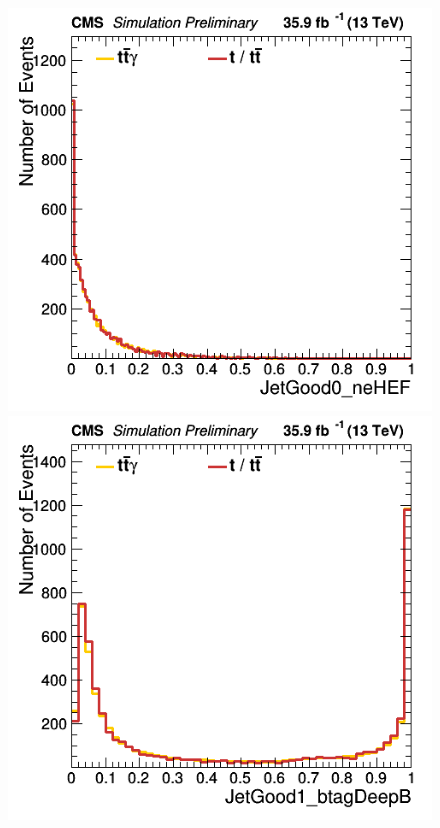 \documentclass[11pt]{scrartcl}
\begin{document}
	\begin{figure}[H]
	\centering
	\begin{minipage}{.5\textwidth}
	  \centering
	  \includegraphics[width=0.75\linewidth]{figures/Notused/JetGood0_neHEF.png}
	\end{minipage}%
	\begin{minipage}{.5\textwidth}
	  \centering
	  \includegraphics[width=0.75\linewidth]{figures/Notused/JetGood1_btagDeepB.png}
	\end{minipage}
	\end{figure}
	
\end{document}
